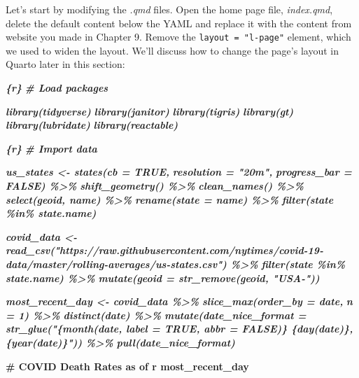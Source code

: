 \documentclass[
]{book}
\newenvironment{Shaded}{\begin{snugshade}}{\end{snugshade}}
\newcommand{\FunctionTok}[1]{\textcolor[rgb]{0.13,0.29,0.53}{\textbf{#1}}}
\newcommand{\InformationTok}[1]{\textcolor[rgb]{0.56,0.35,0.01}{\textbf{\textit{#1}}}}
\begin{document}
Let's start by modifying the \emph{.qmd} files. Open the home page file, \emph{index.qmd}, delete the default content below the YAML and replace it with the content from website you made in Chapter 9. Remove the \texttt{layout\ =\ "l-page"} element, which we used to widen the layout. We'll discuss how to change the page's layout in Quarto later in this section:

\begin{Shaded}
\begin{Highlighting}[]
\InformationTok{\textasciigrave{}\textasciigrave{}\textasciigrave{}\{r\}}
\InformationTok{\# Load packages}

\InformationTok{library(tidyverse)}
\InformationTok{library(janitor)}
\InformationTok{library(tigris)}
\InformationTok{library(gt)}
\InformationTok{library(lubridate)}
\InformationTok{library(reactable)}
\InformationTok{\textasciigrave{}\textasciigrave{}\textasciigrave{}}

\InformationTok{\textasciigrave{}\textasciigrave{}\textasciigrave{}\{r\}}
\InformationTok{\# Import data}

\InformationTok{us\_states \textless{}{-} states(cb = TRUE, }
\InformationTok{                    resolution = "20m",}
\InformationTok{                    progress\_bar = FALSE) \%\textgreater{}\%}
\InformationTok{  shift\_geometry() \%\textgreater{}\% }
\InformationTok{  clean\_names() \%\textgreater{}\% }
\InformationTok{  select(geoid, name) \%\textgreater{}\% }
\InformationTok{  rename(state = name) \%\textgreater{}\% }
\InformationTok{  filter(state \%in\% state.name)}

\InformationTok{covid\_data \textless{}{-} read\_csv("https://raw.githubusercontent.com/nytimes/covid{-}19{-}data/master/rolling{-}averages/us{-}states.csv") \%\textgreater{}\% }
\InformationTok{  filter(state \%in\% state.name) \%\textgreater{}\% }
\InformationTok{  mutate(geoid = str\_remove(geoid, "USA{-}")) }

\InformationTok{most\_recent\_day \textless{}{-} covid\_data \%\textgreater{}\% }
\InformationTok{  slice\_max(order\_by = date,}
\InformationTok{            n = 1) \%\textgreater{}\% }
\InformationTok{  distinct(date) \%\textgreater{}\% }
\InformationTok{  mutate(date\_nice\_format = str\_glue("\{month(date, label = TRUE, abbr = FALSE)\} \{day(date)\}, \{year(date)\}")) \%\textgreater{}\% }
\InformationTok{  pull(date\_nice\_format)}
\InformationTok{\textasciigrave{}\textasciigrave{}\textasciigrave{}}

\FunctionTok{\# COVID Death Rates as of \textasciigrave{}r most\_recent\_day\textasciigrave{}}


\end{Highlighting}
\end{Shaded}
\end{document}
